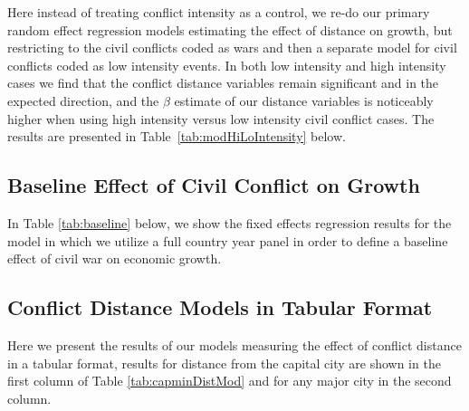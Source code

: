Here instead of treating conflict intensity as a control, we re-do our primary random effect regression models estimating the effect of distance on growth, but restricting to the civil conflicts coded as wars and then a separate model for civil conflicts coded as low intensity events. In both low intensity and high intensity cases we find that the conflict distance variables remain significant and in the expected direction, and the $\beta$ estimate of our distance variables is noticeably higher when using high intensity versus low intensity civil conflict cases. The results are presented in Table~\ref{tab:modHiLoIntensity} below.


\FloatBarrier

\newpage
\subsection{Baseline Effect of Civil Conflict on Growth}

In Table \ref{tab:baseline} below, we show the fixed effects regression results for the model in which we utilize a full country year panel in order to define a baseline effect of civil war on economic growth. 


\FloatBarrier

\newpage
\subsection{Conflict Distance Models in Tabular Format}

Here we present the results of our models measuring the effect of conflict distance in a tabular format, results for distance from the capital city are shown in the first column of Table \ref{tab:capminDistMod} and for any major city in the second column.  



\FloatBarrier
\newpage

